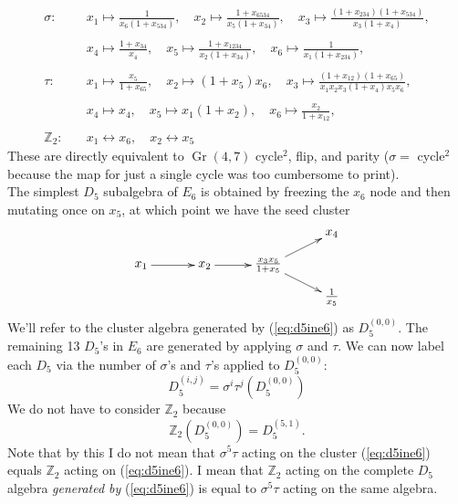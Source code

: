 \documentclass[12pt]{article}
\DeclareMathOperator{\Gr}{Gr}
\def\d5{D_5}
\def\e6{E_6}
\begin{document}
\begin{align*}
	\sigma:\quad &x_1\mapsto \frac{1}{x_6
   \left(1+x_{534}\right)}, \quad x_2\mapsto \frac{1+x_{6534}}{x_5
   \left(1+x_{34}\right)}, \quad x_3\mapsto
   \frac{\left(1+x_{234}\right)
   \left(1+x_{534}\right)}{x_3
   \left(1+x_4\right)},\\ \\ 
   &x_4\mapsto
   \frac{1+x_{34}}{x_4}, \quad x_5\mapsto \frac{1+x_{1234}}{x_2
   \left(1+x_{34}\right)}, \quad x_6\mapsto \frac{1}{x_1
   \left(1+x_{234}\right)},\\ \\
   \tau: \quad&x_1\mapsto \frac{x_5}{1+x_{65}},\quad x_2\mapsto
   \left(1+x_5\right) x_6,\quad x_3\mapsto
   \frac{\left(1+x_{12}\right)
   \left(1+x_{65}\right)}{x_1 x_2 x_3 \left(1+x_4\right)
   x_5 x_6},\\ \\ 
   &x_4\mapsto x_4,\quad x_5\mapsto x_1
   \left(1+x_2\right),\quad x_6\mapsto
   \frac{x_2}{1+x_{12}},\\ \\
   \mathbb{Z}_2:\quad &x_1 \leftrightarrow x_6, \quad x_2 \leftrightarrow x_5
\end{align*}
These are directly equivalent to $\Gr(4,7)$ cycle$^2$, flip, and parity ($\sigma = $ cycle$^2$ because the map for just a single cycle was too cumbersome to print).\\ 

The simplest $\d5$ subalgebra of $\e6$ is obtained by freezing the $x_6$ node and then mutating once on $x_5$, at which point we have the seed cluster
\begin{equation}\label{eq:d5ine6}
\begin{gathered}
\begin{xy} 0;<1pt,0pt>:<0pt,-1pt>::
	(0,25) *+{x_1} ="1",
	(50,25) *+{x_2} ="2",
	(100,25) *+{\frac{x_3 x_5}{1+x_5}} ="3",
	(150,0) *+{x_4} ="4",
	(150,50) *+{\frac{1}{x_5}} ="5",
	"1", {\ar"2"},
	"2", {\ar"3"},
	"3", {\ar"4"},
	"3", {\ar"5"},
\end{xy}
\end{gathered}
\end{equation}
We'll refer to the cluster algebra generated by (\ref{eq:d5ine6}) as $\d5^{(0,0)}$. The remaining 13 $\d5$'s in $\e6$ are generated by applying $\sigma$ and $\tau$. We can now label each $\d5$ via the number of $\sigma$'s and $\tau$'s applied to $\d5^{(0,0)}$:
\begin{equation}
	\d5^{(i,j)} = \sigma^{i}\tau^j(\d5^{(0,0)})
\end{equation}
We do not have to consider $\mathbb{Z}_2$ because 
\begin{equation}
	\mathbb{Z}_2(\d5^{(0,0)}) = \d5^{(5,1)}.
\end{equation}
Note that by this I do not mean that $\sigma^5\tau$ acting on the cluster (\ref{eq:d5ine6}) equals $\mathbb{Z}_2$ acting on (\ref{eq:d5ine6}). I mean that $\mathbb{Z}_2$ acting on the complete $D_5$ algebra \emph{generated by} (\ref{eq:d5ine6}) is equal to $\sigma^5\tau$ acting on the same algebra. 
\end{document}
